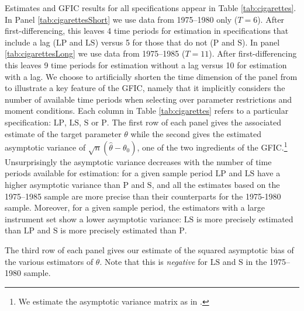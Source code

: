 Estimates and GFIC results for all specifications appear in Table \ref{tab:cigarettes}.
In Panel \ref{tab:cigarettesShort} we use data from 1975--1980 only ($T=6$).
After first-differencing, this leaves 4 time periods for estimation in specifications that include a lag ($\text{LP}$ and $\text{LS}$) versus 5 for those that do not ($\text{P}$ and $\text{S}$).
In panel \ref{tab:cigarettesLong} we use data from 1975--1985 ($T=11$).
After first-differencing this leaves 9 time periods for estimation without a lag versus 10 for estimation with a lag.
We choose to artificially shorten the time dimension of the panel from \cite{BaltagiEtAl2000} to illustrate a key feature of the GFIC, namely that it implicitly considers the number of available time periods when selecting over parameter restrictions and moment conditions. 
Each column in Table \ref{tab:cigarettes} refers to a particular specification: $\text{LP}$, $\text{LS}$, $\text{S}$ or $\text{P}$.
The first row of each panel gives the associated estimate of the target parameter $\theta$ while the second gives the estimated asymptotic variance of $\sqrt{n}(\widehat{\theta} - \theta_0)$, one of the two ingredients of the GFIC.\footnote{We estimate the asymptotic variance matrix as in \cite{BaltagiEtAl2000}.}
Unsurprisingly the asymptotic variance decreases with the number of time periods available for estimation: for a given sample period $\text{LP}$ and $\text{LS}$ have a higher asymptotic variance than $\text{P}$ and $\text{S}$, and all the estimates based on the 1975--1985 sample are more precise than their counterparts for the 1975-1980 sample.
Moreover, for a given sample period, the estimators with a large instrument set show a lower asymptotic variance: $\text{LS}$ is more precisely estimated than $\text{LP}$ and $\text{S}$ is more precisely estimated than $\text{P}$.

The third row of each panel gives our estimate of the squared asymptotic bias of the various estimators of $\theta$.
Note that this is \emph{negative} for $\text{LS}$ and $\text{S}$ in the 1975--1980 sample.

